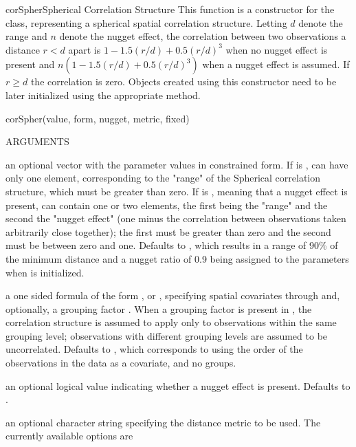 \documentclass[pdftex]{article} \usepackage{url,graphicx}
\renewcommand{\Twiddle}{\mbox{\(\sim\)}}
\begin{document}
\begin{Helpfile}{corSpher}{Spherical Correlation Structure}
  This function is a constructor for the  class,
  representing a spherical spatial correlation structure. Letting $d$
  denote the range and $n$ denote the nugget effect, the correlation
  between two observations a distance $r < d$ apart is
  $1-1.5(r/d)+0.5(r/d)^3$ when no nugget effect is present and
  $n(1-1.5(r/d)+0.5(r/d)^3)$ when a nugget effect is assumed. If $r
  \geq d$ the correlation is zero. Objects created using this
  constructor need to be later initialized using the appropriate
   method.
\begin{Example}
corSpher(value, form, nugget, metric, fixed)
\end{Example}
\begin{Argument}{ARGUMENTS}
\item[\Co{value:}] an optional vector with the parameter values in
  constrained form. If  is ,  can have
  only one element, corresponding to the "range" of the Spherical
  correlation structure, which must be greater than zero. If
   is , meaning that a nugget effect is present,
   can contain one or two elements, the first being the
  "range" and the second the "nugget effect" (one minus the
  correlation between observations taken arbitrarily close together);
  the first must be greater than zero and the second must be between
  zero and one. Defaults to , which results in a range
  of 90\% of the minimum distance and a nugget ratio of 0.9 being
  assigned to the parameters when  is initialized.
\item[\Co{form:}]
a one sided formula of the form \Co{{\Twiddle} S1+...+Sp}, or
\Co{{\Twiddle} S1+...+Sp | g}, specifying spatial covariates 
through  and,  optionally, a grouping factor . 
When a grouping factor is present in , the correlation
structure is assumed to apply only to observations within the same
grouping level; observations with different grouping levels are
assumed to be uncorrelated. Defaults to \Co{{\Twiddle} 1}, which corresponds
to using the order of the observations in the data as a covariate,
and no groups.
\item[\Co{nugget:}]
an optional logical value indicating whether a nugget
effect is present. Defaults to .
\item[\Co{metric:}]
an optional character string specifying the distance
metric to be used. The currently available options are

\end{Argument}
\end{Helpfile}
\end{document}
